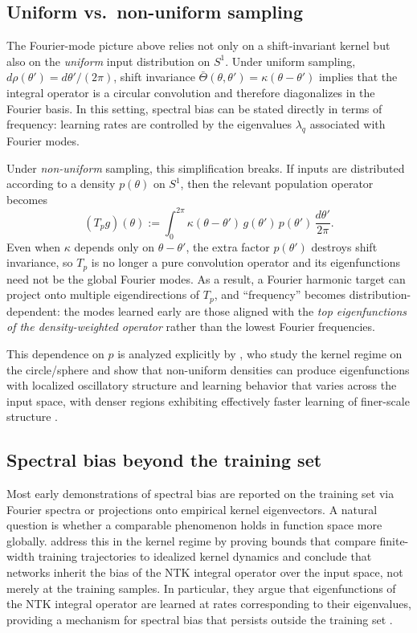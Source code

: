 \subsection{Uniform vs.\ non-uniform sampling}\label{subsec:uniform-nonuniform}

The Fourier-mode picture above relies not only on a shift-invariant kernel but
also on the \emph{uniform} input distribution on $S^1$. Under uniform sampling,
$d\rho(\theta')=d\theta'/(2\pi)$, shift invariance $\bar\Theta(\theta,\theta')
	=\kappa(\theta-\theta')$ implies that the integral operator is a circular
convolution and therefore diagonalizes in the Fourier basis. In this setting,
spectral bias can be stated directly in terms of frequency: learning rates are
controlled by the eigenvalues $\lambda_q$ associated with Fourier modes.

Under \emph{non-uniform} sampling, this simplification breaks. If inputs are
distributed according to a density $p(\theta)$ on $S^1$, then the relevant
population operator becomes
\[
	(T_{p}g)(\theta)
	:=
	\int_0^{2\pi} \kappa(\theta-\theta')\,g(\theta')\,p(\theta')\,\frac{d\theta'}{2\pi}.
\]
Even when $\kappa$ depends only on $\theta-\theta'$, the extra factor
$p(\theta')$ destroys shift invariance, so $T_p$ is no longer a pure convolution
operator and its eigenfunctions need not be the global Fourier modes. As a
result, a Fourier harmonic target can project onto multiple eigendirections of
$T_p$, and ``frequency'' becomes distribution-dependent: the modes learned
early are those aligned with the \emph{top eigenfunctions of the density-weighted
	operator} rather than the lowest Fourier frequencies.

This dependence on $p$ is analyzed explicitly by \citet{basri2020frequencybiasneuralnetworks},
who study the kernel regime on the circle/sphere and show that non-uniform
densities can produce eigenfunctions with localized oscillatory structure and
learning behavior that varies across the input space, with denser regions
exhibiting effectively faster learning of finer-scale structure
\citep{basri2020frequencybiasneuralnetworks}.

\subsection{Spectral bias beyond the training set}

Most early demonstrations of spectral bias are reported on the training set via
Fourier spectra or projections onto empirical kernel eigenvectors. A natural
question is whether a comparable phenomenon holds in function space more
globally. \citet{bowman2022spectralbiasoutsidetraining} address this in the
kernel regime by proving bounds that compare finite-width training trajectories
to idealized kernel dynamics and conclude that networks inherit the bias of the
NTK integral operator over the input space, not merely at the training samples.
In particular, they argue that eigenfunctions of the NTK integral operator are
learned at rates corresponding to their eigenvalues, providing a mechanism for
spectral bias that persists outside the training set \citep{bowman2022spectralbiasoutsidetraining}.


